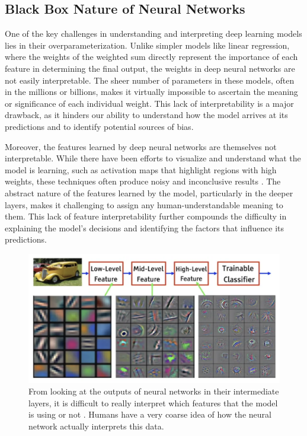 \documentclass[10pt]{article}
\begin{document}
  \subsection{Black Box Nature of Neural Networks}

    One of the key challenges in understanding and interpreting deep learning models lies in their overparameterization. Unlike simpler models like linear regression, where the weights of the weighted sum directly represent the importance of each feature in determining the final output, the weights in deep neural networks are not easily interpretable. The sheer number of parameters in these models, often in the millions or billions, makes it virtually impossible to ascertain the meaning or significance of each individual weight. This lack of interpretability is a major drawback, as it hinders our ability to understand how the model arrives at its predictions and to identify potential sources of bias.

    Moreover, the features learned by deep neural networks are themselves not interpretable. While there have been efforts to visualize and understand what the model is learning, such as activation maps that highlight regions with high weights, these techniques often produce noisy and inconclusive results \cite{gradcam}. The abstract nature of the features learned by the model, particularly in the deeper layers, makes it challenging to assign any human-understandable meaning to them. This lack of feature interpretability further compounds the difficulty in explaining the model's decisions and identifying the factors that influence its predictions.

    \begin{figure}[H]
      \centering 
      \includegraphics[scale=0.4]{img/features.png}
      \caption{From looking at the outputs of neural networks in their intermediate layers, it is difficult to really interpret which features that the model is using or not \cite{cnn}. Humans have a very coarse idea of how the neural network actually interprets this data.} 
      \label{fig:features}
    \end{figure}
\end{document}
